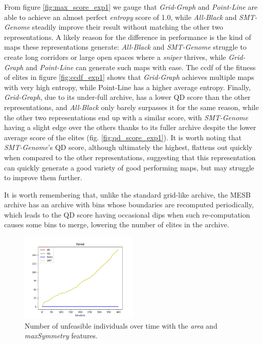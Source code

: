 From figure \ref{fig:max_score_exp1} we gauge that \textit{Grid-Graph} and \textit{Point-Line} are able to achieve an almost perfect \textit{entropy} score of 1.0, while \textit{All-Black} and \textit{SMT-Genome} steadily improve their result without matching the other two representations. A likely reason for the difference in performance is the kind of maps these representations generate: \textit{All-Black} and \textit{SMT-Genome} struggle to create long corridors or large open spaces where a \textit{sniper} thrives, while \textit{Grid-Graph} and \textit{Point-Line} can generate such maps with ease. The ccdf of the fitness of elites in figure \cref{fig:ccdf_exp1} shows that \textit{Grid-Graph} achieves multiple maps with very high entropy, while Point-Line has a higher average entropy. Finally, \textit{Grid-Graph}, due to its under-full archive, has a lower QD score than the other representations, and \textit{All-Black} only barely surpasses it for the same reason, while the other two representations end up with a similar score, with \textit{SMT-Genome} having a slight edge over the others thanks to its fuller archive despite the lower average score of the elites (fig. \cref{fig:qd_score_exp1}). It is worth noting that \textit{SMT-Genome}'s QD score, although ultimately the highest, flattens out quickly when compared to the other representations, suggesting that this representation can quickly generate a good variety of good performing maps, but may struggle to improve them further.

It is worth remembering that, unlike the standard grid-like archive, the MESB archive has an archive with bins whose boundaries are recomputed periodically, which leads to the QD score having occasional dips when such re-computation causes some bins to merge, lowering the number of elites in the archive.


\begin{figure}[H]
    \centering
    \includegraphics[width=0.5\textwidth]{images/Exp1/failed.png}
    \caption{Number of unfeasible individuals over time with the \textit{area} and \textit{maxSymmetry} features.}
    \label{fig:failed_exp1}
\end{figure}

